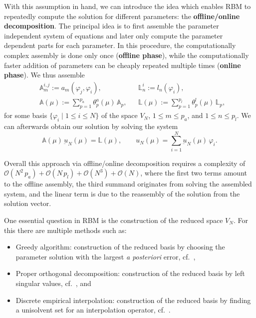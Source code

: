 With this assumption in hand, we can introduce the idea which enables RBM to repeatedly compute the solution for different parameters: the \textbf{offline/online decomposition}.
The principal idea is to first assemble the parameter independent system of equations and later only compute the parameter dependent parts for each parameter.
In this procedure, the computationally complex assembly is done only once (\textbf{offline phase}), while the computationally faster addition of parameters can be cheaply repeated multiple times (\textbf{online phase}).
We thus assemble
\begin{align*}\label{OffOnComp}
    &\mathbb{A}^{i, j}_m := a_m(\varphi_j, \varphi_i), &&\mathbb{L}^i_n := l_n(\varphi_i), \tag*{(offline)} \\
    &\mathbb{A}(\mu) := \sum\limits_{p = 1}^{p_a} \theta_p^a(\mu)\, \mathbb{A}_p, &&\mathbb{L}(\mu) := \sum\limits_{p = 1}^{p_l} \theta_p^l(\mu)\, \mathbb{L}_p, \tag*{(online)}
\end{align*}
for some basis $\{ \varphi_i \; | \; 1 \leq i \leq N \}$ of the space $V_N$, $1 \leq m \leq p_a$, and $1 \leq n \leq p_l$.
We can afterwards obtain our solution by solving the system
\begin{equation*}\label{OnOffSystem}
    \mathbb{A}(\mu)\, \underbar{u}_N(\mu) = \mathbb{L}(\mu), \qquad u_N(\mu) = \sum\limits_{i = 1}^N \underbar{u}_N(\mu)\, \varphi_i.
\end{equation*}

Overall this approach via offline/online decomposition requires a complexity of $\mathcal{O}(N^2 \, p_a) + \mathcal{O}(N \, p_l) + \mathcal{O}(N^3) + \mathcal{O}(N)$, where the first two terms amount to the offline assembly, the third summand originates from solving the assembled system, and the linear term is due to the reassembly of the solution from the solution vector.

One essential question in RBM is the construction of the reduced space $V_N$. For this there are multiple methods such as:
\begin{itemize}
    \item Greedy algorithm: construction of the reduced basis by choosing the parameter solution with the largest \textit{a posteriori} error, cf.~\cite{DeVore2013, Veroy2003, Haasdonk2013},
    \item Proper orthogonal decomposition: construction of the reduced basis by left singular values, cf.~\cite{Kunisch2001, Haasdonk2008, Haasdonk2013}, and
    \item Discrete empirical interpolation: construction of the reduced basis by finding a unisolvent set for an interpolation operator, cf.~\cite{Barrault2004, Carlberg2011, Chaturantabut2010, Drohmann2012, Haasdonk2013}.
\end{itemize}

